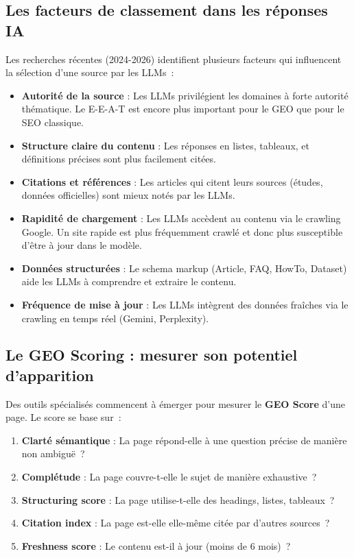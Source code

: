 \documentclass[12pt,a4paper,twoside]{report}
\newcommand{\keyword}[1]{\textbf{\textcolor{googleblue}{#1}}}
\begin{document}
\subsection{Les facteurs de classement dans les réponses IA}

Les recherches récentes (2024-2026) identifient plusieurs facteurs qui influencent la sélection d'une source par les LLMs~:

\begin{itemize}
    \item \textbf{Autorité de la source} : Les LLMs privilégient les domaines à forte autorité thématique. Le E-E-A-T est encore plus important pour le GEO que pour le SEO classique.
    \item \textbf{Structure claire du contenu} : Les réponses en listes, tableaux, et définitions précises sont plus facilement citées.
    \item \textbf{Citations et références} : Les articles qui citent leurs sources (études, données officielles) sont mieux notés par les LLMs.
    \item \textbf{Rapidité de chargement} : Les LLMs accèdent au contenu via le crawling Google. Un site rapide est plus fréquemment crawlé et donc plus susceptible d'être à jour dans le modèle.
    \item \textbf{Données structurées} : Le schema markup (Article, FAQ, HowTo, Dataset) aide les LLMs à comprendre et extraire le contenu.
    \item \textbf{Fréquence de mise à jour} : Les LLMs intègrent des données fraîches via le crawling en temps réel (Gemini, Perplexity).
\end{itemize}

\subsection{Le GEO Scoring : mesurer son potentiel d'apparition}

Des outils spécialisés commencent à émerger pour mesurer le \keyword{GEO Score} d'une page. Le score se base sur~:

\begin{enumerate}
    \item \textbf{Clarté sémantique} : La page répond-elle à une question précise de manière non ambiguë~?
    \item \textbf{Complétude} : La page couvre-t-elle le sujet de manière exhaustive~?
    \item \textbf{Structuring score} : La page utilise-t-elle des headings, listes, tableaux~?
    \item \textbf{Citation index} : La page est-elle elle-même citée par d'autres sources~?
    \item \textbf{Freshness score} : Le contenu est-il à jour (moins de 6 mois)~?
\end{enumerate}
\end{document}
